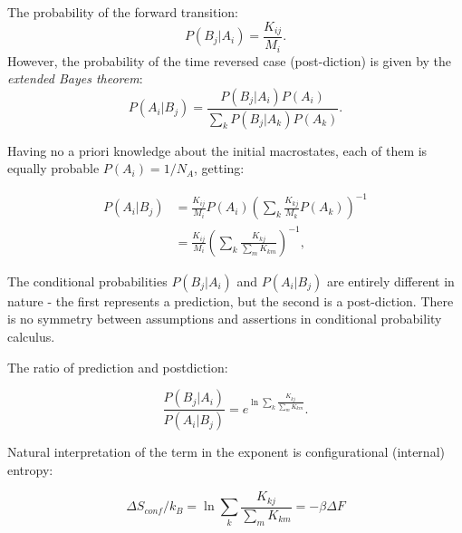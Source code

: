 \documentclass[a0]{sciposter}
\begin{document}
\begin{multicols}{3}
\begin{flushleft}
The probability of the forward transition:
\begin{equation}
\label{ForwardProb}
  P(B_j|A_i)= \frac{K_{ij}}{M_i}.
\end{equation}
However, the probability of the time reversed case (post-diction) is given by the \textit{extended Bayes theorem}:
\begin{equation}
  P(A_i|B_j)=\frac{P(B_j|A_i)P(A_i)}{\sum_k P(B_j|A_k)P(A_k)}.
\end{equation}

Having no a priori knowledge about the initial macrostates, each of them is equally probable $P(A_i)= 1/N_A$, getting:

\begin{equation}
\begin{aligned}
  P(A_i|B_j) &= \frac{K_{ij}}{M_i} P(A_i) \left( \sum_k \frac{K_{kj}}{M_k}P(A_k) \right)^{-1}\\
  &= \frac{K_{ij}}{M_i} \left( \sum_{k} \frac{K_{kj}}{\sum_m K_{km}} \right)^{-1},
\end{aligned}
\end{equation}
\vspace{0.5cm}
\begin{tcolorbox}[colframe=green!500!white,colback=white!50!white,boxrule=3pt]
The conditional probabilities $P(B_j|A_i)$ and $P(A_i|B_j)$ are entirely different in nature - the first represents a prediction, but the second is a post-diction. There is no symmetry between assumptions and assertions in conditional probability calculus.
\end{tcolorbox}
\vspace{0.5cm}
The ratio of prediction and postdiction:

\begin{tcolorbox}[colframe=red!500!white,colback=white!50!white,boxrule=3pt]
\begin{equation}
\label{MacrostatesPRatio}
  \frac{P(B_j|A_i)}{P(A_i|B_j)}= e^{\ln{\sum_{k} \frac{K_{kj}}{\sum_m K_{km}}}}.
\end{equation}
\end{tcolorbox}
\vspace{0.5cm}

Natural interpretation of the term in the exponent is configurational (internal) entropy: 
\begin{tcolorbox}[colframe=green!500!white,colback=white!50!white,boxrule=3pt]
\begin{equation}
\Delta S_{conf} /k_B = \ln{\sum_{k} \frac{K_{kj}}{\sum_m K_{km}}} = - \beta \Delta F
\end{equation}
\end{tcolorbox}
\vspace{0.5cm}


\end{flushleft}
\end{multicols}
\end{document}
